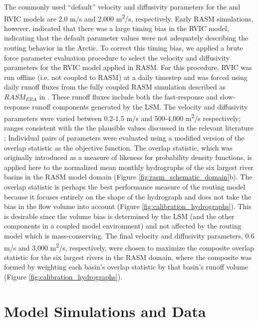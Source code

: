 \documentclass[jgrga, draft]{agutex}
\begin{document}
\begin{article}
\begin{itemize}[leftmargin=+.5in]
\begin{itemize}[leftmargin=+.5in]
The commonly used ``default'' velocity and diffusivity parameters for the \citet{Lohmann_1996} and RVIC models are 2.0 m/s and 2,000 m\textsuperscript{2}/s, respectively.
Early RASM simulations, however, indicated that there was a large timing bias in the RVIC model, indicating that the default parameter values were not adequately describing the routing behavior in the Arctic.
To correct this timing bias, we applied a brute force parameter evaluation procedure to select the velocity and diffusivity parameters for the RVIC model applied in RASM.
For this procedure, RVIC was run offline (i.e. not coupled to RASM) at a daily timestep and was forced using daily runoff fluxes from the fully coupled RASM simulation described as $RASM_{ERA}$ in \citet{Hamman_2016}.
These runoff fluxes include both the fast-response and slow-response runoff components generated by the LSM.
The velocity and diffusivity parameters were varied between 0.2-1.5 m/s and 500-4,000 m\textsuperscript{2}/s respectively; ranges consistent with the the plausible values discussed in the relevant literature \citep[e.g.][]{Decharme_2010,Lohmann_1996};
Individual pairs of parameters were evaluated using a modified version of the overlap statistic \citep{Perkins_2007} as the objective function.
The overlap statistic, which was originally introduced as a measure of likeness for probability density functions, is applied here to the normalized mean monthly hydrographs of the six largest river basins in the RASM model domain (Figure \ref{fig:rasm_schematic_domain}b).
The overlap statistic is perhaps the best performance measure of the routing model because it focuses entirely on the shape of the hydrograph and does not take the bias in the flow volume into account (Figure \ref{fig:calibration_hydrographs}). This is desirable since the volume bias is determined by the LSM (and the other components in a coupled model environment) and not affected by the routing model which is mass-conserving.
The final velocity and diffusivity parameters, 0.6 m/s and 3,000 m\textsuperscript{2}/s, respectively, were chosen to maximize the composite overlap statistic for the six largest rivers in the RASM domain, where the composite was formed by weighting each basin's overlap statistic by that basin's runoff volume (Figure \ref{fig:calibration_hydrographs}).

\section{Model Simulations and Data}
\label{sec:data}


\end{itemize}
\end{itemize}
\end{article}
\end{document}
